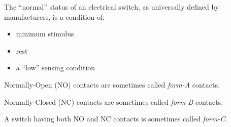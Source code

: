 





The ``normal'' status of an electrical switch, as universally defined by manufacturers, is a condition of:

\begin{itemize}
\item{} minimum stimulus
\item{} rest
\item{} a ``low'' sensing condition
\end{itemize}

Normally-Open (NO) contacts are sometimes called {\it form-A} contacts.

\vskip 10pt

Normally-Closed (NC) contacts are sometimes called {\it form-B} contacts.

\vskip 10pt

A switch having both NO and NC contacts is sometimes called {\it form-C}.






